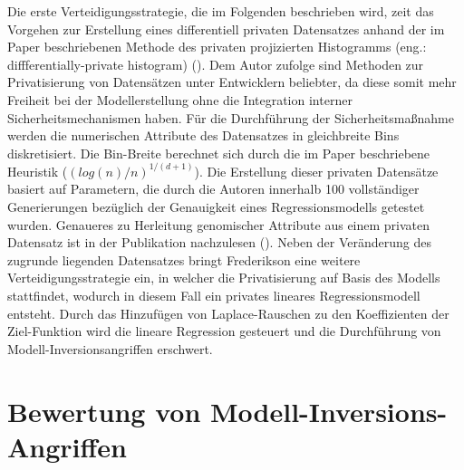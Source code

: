 Die erste Verteidigungsstrategie, die im Folgenden beschrieben wird, zeit das Vorgehen zur Erstellung eines differentiell privaten Datensatzes anhand der im Paper beschriebenen \glqq Methode des privaten projizierten Histogramms\grqq{} (eng.: diffferentially-private histogram) (\cite[9]{fredrikson_privacy_2014}). Dem Autor zufolge sind Methoden zur Privatisierung von Datensätzen unter Entwicklern beliebter, da diese somit mehr Freiheit bei der Modellerstellung ohne die Integration interner Sicherheitsmechanismen haben. Für die Durchführung der Sicherheitsmaßnahme werden die numerischen Attribute des Datensatzes in gleichbreite Bins diskretisiert. Die Bin-Breite berechnet sich durch die im Paper beschriebene Heuristik ($(log(n)/n)^{1/(d+1)}$). Die Erstellung dieser privaten Datensätze basiert auf Parametern, die durch die Autoren innerhalb 100 vollständiger Generierungen bezüglich der Genauigkeit eines Regressionsmodells getestet wurden. Genaueres zu Herleitung genomischer Attribute aus einem privaten Datensatz ist in der Publikation nachzulesen (\cite[9]{fredrikson_privacy_2014}). Neben der Veränderung des zugrunde liegenden Datensatzes bringt Frederikson eine weitere Verteidigungsstrategie ein, in welcher die Privatisierung auf Basis des Modells stattfindet, wodurch in diesem Fall ein privates lineares Regressionsmodell entsteht. Durch das Hinzufügen von Laplace-Rauschen zu den Koeffizienten der Ziel-Funktion wird die lineare Regression gesteuert und die Durchführung von Modell-Inversionsangriffen erschwert.
\section{Bewertung von Modell-Inversions-Angriffen}
